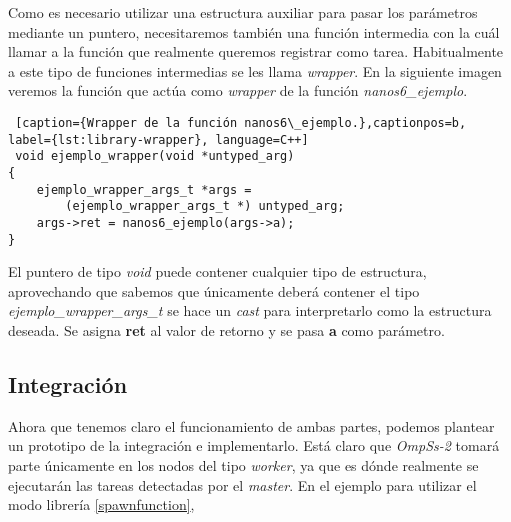 Como es necesario utilizar una estructura auxiliar para pasar los parámetros mediante un puntero, necesitaremos también una función intermedia con la cuál llamar a la función que realmente queremos registrar como tarea. Habitualmente a este tipo de funciones intermedias se les llama \textit{wrapper}. En la siguiente imagen veremos la función que actúa como \textit{wrapper} de la función \textit{nanos6\_ejemplo}. \smallskip

\begin{lstlisting} [caption={Wrapper de la función nanos6\_ejemplo.},captionpos=b, label={lst:library-wrapper}, language=C++]
 void ejemplo_wrapper(void *untyped_arg)
{
    ejemplo_wrapper_args_t *args = 
        (ejemplo_wrapper_args_t *) untyped_arg;
    args->ret = nanos6_ejemplo(args->a);
}
\end{lstlisting}

El puntero de tipo \textit{void} puede contener cualquier tipo de estructura, aprovechando que sabemos que únicamente deberá contener el tipo \textit{ejemplo\_wrapper\_args\_t} se hace un \textit{cast} para interpretarlo como la estructura deseada. Se asigna \textbf{ret} al valor de retorno y se pasa \textbf{a} como parámetro.


\subsection{Integración}


Ahora que tenemos claro el funcionamiento de ambas partes, podemos plantear un prototipo de la integración e implementarlo. Está claro que \textit{OmpSs-2} tomará parte únicamente en los nodos del tipo \textit{worker}, ya que es dónde realmente se ejecutarán las tareas detectadas por el \textit{master}. En el ejemplo para utilizar el modo librería \ref{spawnfunction}, 


